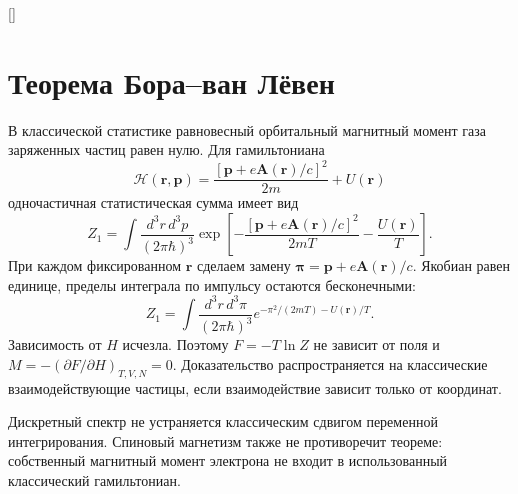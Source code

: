 \documentclass[../final.tex]{subfiles}
\begin{document}
\begin{rbox}[unbreakable,left=18pt,right=18pt,top=14pt,bottom=10pt]{[]}
\centering
\captionsetup{font=footnotesize,hypcap=false,skip=7pt}
\end{rbox}

\section{Теорема Бора--ван Лёвен}
В классической статистике равновесный орбитальный магнитный момент газа
заряженных частиц равен нулю. Для гамильтониана
\begin{equation*}
 \mathcal H(\mathbf r,\mathbf p)
 =\frac{[\mathbf p+e\mathbf A(\mathbf r)/c]^2}{2m}+U(\mathbf r)
\end{equation*}
одночастичная статистическая сумма имеет вид
\begin{equation*}
 Z_1=\int\frac{d^3r\,d^3p}{(2\pi\hbar)^3}
 \exp\left[-\frac{[\mathbf p+e\mathbf A(\mathbf r)/c]^2}{2mT}
 -\frac{U(\mathbf r)}T\right].
\end{equation*}
При каждом фиксированном $\mathbf r$ сделаем замену
$\mathbf\pi=\mathbf p+e\mathbf A(\mathbf r)/c$.
Якобиан равен единице, пределы интеграла по импульсу остаются бесконечными:
\begin{equation*}
 Z_1=\int\frac{d^3r\,d^3\pi}{(2\pi\hbar)^3}
 e^{-\pi^2/(2mT)-U(\mathbf r)/T}.
\end{equation*}
Зависимость от $H$ исчезла. Поэтому $F=-T\ln Z$ не зависит от поля и
$M=-(\partial F/\partial H)_{T,V,N}=0$.
Доказательство распространяется на классические взаимодействующие частицы,
если взаимодействие зависит только от координат.

Дискретный спектр не устраняется классическим сдвигом переменной интегрирования.
Спиновый магнетизм также не противоречит теореме: собственный магнитный момент
электрона не входит в использованный классический гамильтониан.
\end{document}
